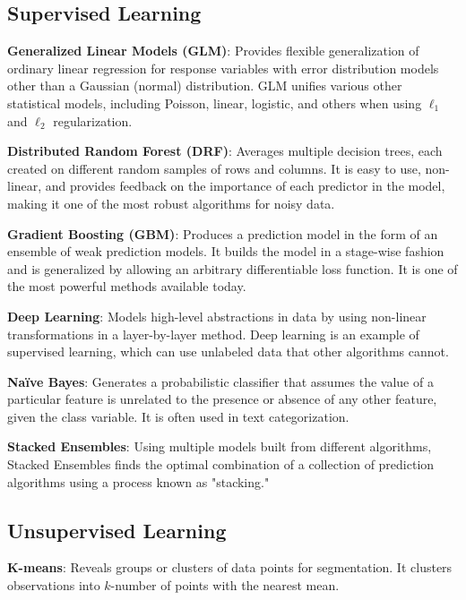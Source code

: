 {{\subsection{Supervised Learning}

{\textbf{Generalized Linear Models (GLM)}}: Provides flexible generalization of ordinary linear regression for response variables with error distribution models other than a Gaussian (normal) distribution. GLM unifies various other statistical models, including Poisson, linear, logistic, and others when using $\ell_1$ and $\ell_2$ regularization.

{\textbf{Distributed Random Forest (DRF)}}: Averages multiple decision trees, each created on different random samples of rows and columns. It is easy to use, non-linear, and provides feedback on the importance of each predictor in the model, making it one of the most robust algorithms for noisy data.

{\textbf{Gradient Boosting (GBM)}}: Produces a prediction model in the form of an ensemble of weak prediction models. It builds the model in a stage-wise fashion and is generalized by allowing an arbitrary differentiable loss function. It is one of the most powerful methods available today.

{\textbf{Deep Learning}}: Models high-level abstractions in data by using non-linear transformations in a layer-by-layer method. Deep learning is an example of supervised learning, which can use unlabeled data that other algorithms cannot.

{\textbf{Na\"{i}ve Bayes}}: Generates a probabilistic classifier that assumes the value of a particular feature is unrelated to the presence or absence of any other feature, given the class variable. It is often used in text categorization.

{\textbf{Stacked Ensembles}}: Using multiple models built from different algorithms, Stacked Ensembles finds the optimal combination of a collection of prediction algorithms using a process known as "stacking."

\subsection{Unsupervised Learning}

{\textbf{K-means}}: Reveals groups or clusters of data points for segmentation. It clusters observations into $k$-number of points with the nearest mean.

}}
